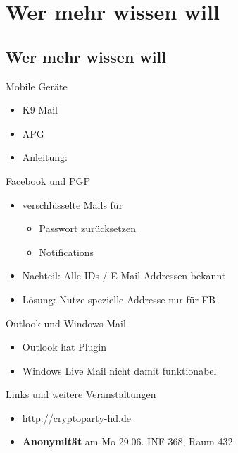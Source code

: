\section{Wer mehr wissen will}
\subsection*{Wer mehr wissen will}


\begin{frame}{Mobile Geräte}
	\begin{itemize}
		\item K9 Mail
		\item APG
		\item Anleitung: %
	\end{itemize}
\end{frame}

\begin{frame}{Facebook und PGP}
	\begin{itemize}
		\item verschlüsselte Mails für
			\begin{itemize}
				\item Passwort zurücksetzen
				\item Notifications
			\end{itemize}
		\item Nachteil: Alle IDs / E-Mail Addressen bekannt
		\item Lösung: Nutze spezielle Addresse nur für FB
	\end{itemize}
\end{frame}

\begin{frame}{Outlook und Windows Mail}
	\begin{itemize}
		\item Outlook hat Plugin
		\item Windows Live Mail nicht damit funktionabel
	\end{itemize}
\end{frame}

\begin{frame}{Links und weitere Veranstaltungen}
	\begin{itemize}
		\item \url{http://cryptoparty-hd.de} \\[10pt]
		\item \textbf{Anonymität} am Mo 29.06. INF 368, Raum 432
	\end{itemize}
\end{frame}

